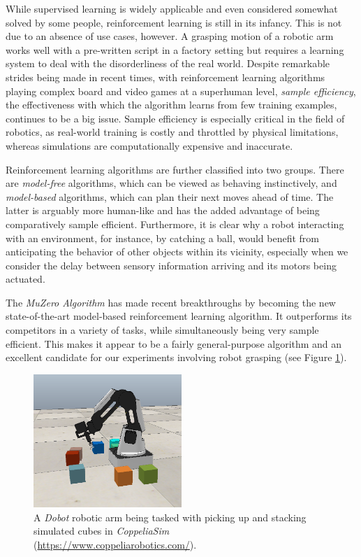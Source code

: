 While supervised learning is widely applicable and even considered somewhat solved by some people, reinforcement learning is still in its infancy. This is not due to an absence of use cases, however. A grasping motion of a robotic arm works well with a pre-written script in a factory setting but requires a learning system to deal with the disorderliness of the real world. Despite remarkable strides being made in recent times, with reinforcement learning algorithms playing complex board and video games at a superhuman level, \textit{sample efficiency}, the effectiveness with which the algorithm learns from few training examples, continues to be a big issue. Sample efficiency is especially critical in the field of robotics, as real-world training is costly and throttled by physical limitations, whereas simulations are computationally expensive and inaccurate.

Reinforcement learning algorithms are further classified into two groups. There are \textit{model-free} algorithms, which can be viewed as behaving instinctively, and \textit{model-based} algorithms, which can plan their next moves ahead of time. The latter is arguably more human-like and has the added advantage of being comparatively sample efficient. Furthermore, it is clear why a robot interacting with an environment, for instance, by catching a ball, would benefit from anticipating the behavior of other objects within its vicinity, especially when we consider the delay between sensory information arriving and its motors being actuated.

The \textit{MuZero Algorithm} \cite{muzero} has made recent breakthroughs by becoming the new state-of-the-art model-based reinforcement learning algorithm. It outperforms its competitors in a variety of tasks, while simultaneously being very sample efficient. This makes it appear to be a fairly general-purpose algorithm and an excellent candidate for our experiments involving robot grasping (see Figure \ref{fig:cube_stacking}).
\begin{figure}
    \centering
    \includegraphics[width=0.5\textwidth]{assets/cube_stacking.png}
    \caption{A \textit{Dobot} robotic arm being tasked with picking up and stacking simulated cubes in \textit{CoppeliaSim} (\url{https://www.coppeliarobotics.com/}).}
    \label{fig:cube_stacking}
\end{figure}


